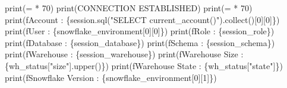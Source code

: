 \documentclass[
  letterpaper,
  DIV=11,
  numbers=noendperiod]{scrreprt}
\newenvironment{Shaded}{\begin{snugshade}}{\end{snugshade}}
\newcommand{\BuiltInTok}[1]{\textcolor[rgb]{0.00,0.23,0.31}{#1}}
\newcommand{\DecValTok}[1]{\textcolor[rgb]{0.68,0.00,0.00}{#1}}
\newcommand{\NormalTok}[1]{\textcolor[rgb]{0.00,0.23,0.31}{#1}}
\newcommand{\OperatorTok}[1]{\textcolor[rgb]{0.37,0.37,0.37}{#1}}
\newcommand{\SpecialCharTok}[1]{\textcolor[rgb]{0.37,0.37,0.37}{#1}}
\newcommand{\SpecialStringTok}[1]{\textcolor[rgb]{0.13,0.47,0.30}{#1}}
\newcommand{\StringTok}[1]{\textcolor[rgb]{0.13,0.47,0.30}{#1}}
\begin{document}
\begin{Shaded}
\begin{Highlighting}[]
\BuiltInTok{print}\NormalTok{(}\StringTok{\textquotesingle{}=\textquotesingle{}} \OperatorTok{*} \DecValTok{70}\NormalTok{)}
\BuiltInTok{print}\NormalTok{(}\StringTok{\textquotesingle{}CONNECTION ESTABLISHED\textquotesingle{}}\NormalTok{)}
\BuiltInTok{print}\NormalTok{(}\StringTok{\textquotesingle{}=\textquotesingle{}} \OperatorTok{*} \DecValTok{70}\NormalTok{)}
\BuiltInTok{print}\NormalTok{(}\SpecialStringTok{f\textquotesingle{}Account                : }\SpecialCharTok{\{}\NormalTok{session}\SpecialCharTok{.}\NormalTok{sql(}\StringTok{"SELECT current\_account()"}\NormalTok{)}\SpecialCharTok{.}\NormalTok{collect()[}\DecValTok{0}\NormalTok{][}\DecValTok{0}\NormalTok{]}\SpecialCharTok{\}}\SpecialStringTok{\textquotesingle{}}\NormalTok{)}
\BuiltInTok{print}\NormalTok{(}\SpecialStringTok{f\textquotesingle{}User                   : }\SpecialCharTok{\{}\NormalTok{snowflake\_environment[}\DecValTok{0}\NormalTok{][}\DecValTok{0}\NormalTok{]}\SpecialCharTok{\}}\SpecialStringTok{\textquotesingle{}}\NormalTok{)}
\BuiltInTok{print}\NormalTok{(}\SpecialStringTok{f\textquotesingle{}Role                   : }\SpecialCharTok{\{}\NormalTok{session\_role}\SpecialCharTok{\}}\SpecialStringTok{\textquotesingle{}}\NormalTok{)}
\BuiltInTok{print}\NormalTok{(}\SpecialStringTok{f\textquotesingle{}Database               : }\SpecialCharTok{\{}\NormalTok{session\_database}\SpecialCharTok{\}}\SpecialStringTok{\textquotesingle{}}\NormalTok{)}
\BuiltInTok{print}\NormalTok{(}\SpecialStringTok{f\textquotesingle{}Schema                 : }\SpecialCharTok{\{}\NormalTok{session\_schema}\SpecialCharTok{\}}\SpecialStringTok{\textquotesingle{}}\NormalTok{)}
\BuiltInTok{print}\NormalTok{(}\SpecialStringTok{f\textquotesingle{}Warehouse              : }\SpecialCharTok{\{}\NormalTok{session\_warehouse}\SpecialCharTok{\}}\SpecialStringTok{\textquotesingle{}}\NormalTok{)}
\BuiltInTok{print}\NormalTok{(}\SpecialStringTok{f\textquotesingle{}Warehouse Size         : }\SpecialCharTok{\{}\NormalTok{wh\_status[}\StringTok{"size"}\NormalTok{]}\SpecialCharTok{.}\NormalTok{upper()}\SpecialCharTok{\}}\SpecialStringTok{\textquotesingle{}}\NormalTok{)}
\BuiltInTok{print}\NormalTok{(}\SpecialStringTok{f\textquotesingle{}Warehouse State        : }\SpecialCharTok{\{}\NormalTok{wh\_status[}\StringTok{"state"}\NormalTok{]}\SpecialCharTok{\}}\SpecialStringTok{\textquotesingle{}}\NormalTok{)}
\BuiltInTok{print}\NormalTok{(}\SpecialStringTok{f\textquotesingle{}Snowflake Version      : }\SpecialCharTok{\{}\NormalTok{snowflake\_environment[}\DecValTok{0}\NormalTok{][}\DecValTok{1}\NormalTok{]}\SpecialCharTok{\}}\SpecialStringTok{\textquotesingle{}}\NormalTok{)}

\end{Highlighting}
\end{Shaded}
\end{document}
